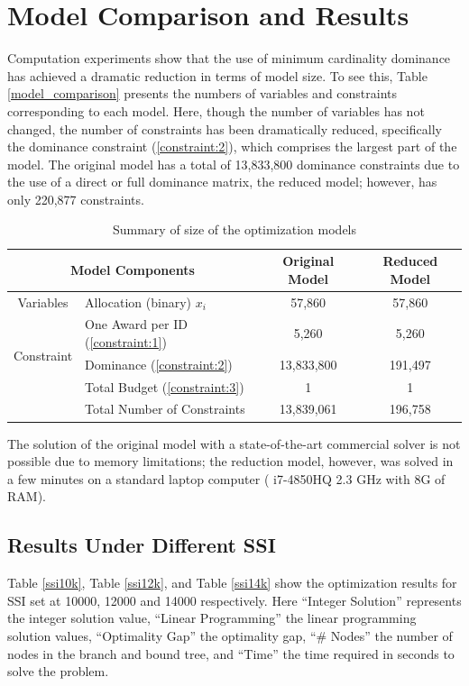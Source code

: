 \documentclass[12pt,english]{report}
\begin{document}
\section{Model Comparison and Results}
Computation experiments show that the use of minimum cardinality dominance has achieved a dramatic reduction in terms of model size.  To see this, Table \ref{model_comparison} presents the numbers of variables and constraints corresponding to each model. Here, though the number of variables has not changed, the number of constraints has been dramatically reduced, specifically the dominance constraint (\ref{constraint:2}), which comprises the largest part of the model. The original model has a total of 13,833,800 dominance constraints due to the use of a direct or full dominance matrix, the reduced model; however, has only 220,877 constraints.

\begin{table}[H]
\centering
\begin{tabular}{|c|l|c|c|}
\hline \hline
\multicolumn{2}{|c|}{Model Components}                                        &
Original Model & Reduced Model \\ \hline
Variables                   & \multicolumn{1}{|l|}{Allocation (binary)  $x_i$}
& 57,860         & 57,860        \\ \hline
\multirow{3}{*}{Constraint} & One Award per ID  (\ref{constraint:1})        &
5,260          & 5,260         \\ \cline{2-4}
& Dominance  (\ref{constraint:2})               & 13,833,800     & 191,497
\\ \cline{2-4}
& Total Budget   (\ref{constraint:3})           & 1              & 1
\\ \cline{2-4}
& Total Number of Constraints                   & 13,839,061     & 196,758
\\ \hline
\end{tabular}
\caption{Summary of size of the optimization models }
\label{model_comparison}
\label{size_model}
\end{table}

The solution of the original model with a state-of-the-art commercial solver is not possible due to memory limitations; the reduction model, however,  was solved in a few minutes on a standard laptop computer ( i7-4850HQ 2.3 GHz with 8G of RAM).

\subsection{Results Under Different SSI}
Table \ref{ssi10k}, Table \ref{ssi12k}, and Table \ref{ssi14k} show the optimization results for SSI set at 10000, 12000 and 14000 respectively.  Here  ``Integer Solution'' represents the integer solution value,  ``Linear Programming'' the linear programming solution values, ``Optimality Gap'' the optimality gap,  ``\# Nodes'' the number of nodes in the branch and bound tree,  and ``Time'' the time required in seconds to solve the problem. 
\end{document}
